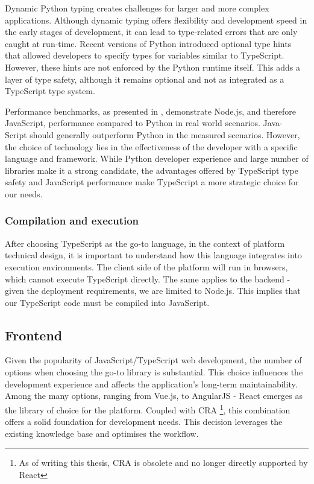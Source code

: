 Dynamic Python typing creates challenges for larger and more complex applications.
Although dynamic typing offers flexibility and development speed in the early stages of development, it can lead to type-related errors that are only caught at run-time.
Recent versions of Python introduced optional type hints that allowed developers to specify types for variables similar to TypeScript.
However, these hints are not enforced by the Python runtime itself.
This adds a layer of type safety, although it remains optional and not as integrated as a TypeScript type system.

Performance benchmarks, as presented in \cite{PerformancePythonNode}, demonstrate Node.js, and therefore JavaScript, performance compared to Python in real world scenarios.
Java-\\Script should generally outperform Python in the measured scenarios.
However, the choice of technology lies in the effectiveness of the developer with a specific language and framework.
While Python developer experience and large number of libraries make it a strong candidate, the advantages offered by TypeScript type safety and JavaScript performance make TypeScript a more strategic choice for our needs.

% 

\subsubsection{Compilation and execution}
\label{subsubsec:compilation-execution}
After choosing TypeScript as the go-to language, in the context of platform technical design, it is important to understand how this language integrates into execution environments.
The client side of the platform will run in browsers, which cannot execute TypeScript directly.
The same applies to the backend - given the deployment requirements, we are limited to Node.js.
This implies that our TypeScript code must be compiled into JavaScript.

\subsection{Frontend}
\label{subsec:frontend-library}
Given the popularity of JavaScript/TypeScript web development, the number of options when choosing the go-to library is substantial.
This choice influences the development experience and affects the application's long-term maintainability. 
Among the many options, ranging from Vue.js, to AngularJS - React emerges as the library of choice for the platform. 
Coupled with \ac{CRA} \footnote{As of writing this thesis, \ac{CRA} is obsolete and no longer directly supported by React}, this combination offers a solid foundation for development needs.
This decision leverages the existing knowledge base and optimises the workflow. 

